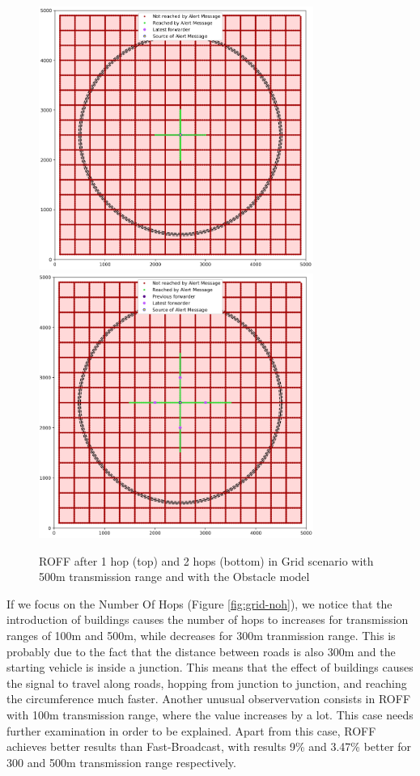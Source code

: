 		\begin{figure}[H]
			\centering
			\includegraphics[width=0.8\textwidth]{immagini/grid-300/b1/roff-1hop}
			\includegraphics[width=0.8\textwidth]{immagini/grid-300/b1/roff-2hop}
			\caption{ROFF after 1 hop (top) and 2 hops (bottom) in Grid scenario with 500m transmission range and with the Obstacle model}
			\label{fig:roff-b1-grid-transmission}
		\end{figure}
		
		If we focus on the Number Of Hops (Figure \ref{fig:grid-noh}), we notice that the introduction of buildings causes the number of hops to increases for transmission ranges of 100m and 500m, while decreases for 300m tranmission range. This is probably due to the fact that the distance between roads is also 300m and the starting vehicle is inside a junction. This means that the effect of buildings causes the signal to travel along roads, hopping from junction to junction, and reaching the circumference much faster. Another unusual observervation consists in ROFF with 100m transmission range, where the value increases by a lot. This case needs further examination in order to be explained. Apart from this case, ROFF achieves better results than Fast-Broadcast, with results 9\% and 3.47\% better for 300 and 500m transmission range respectively. 
		
